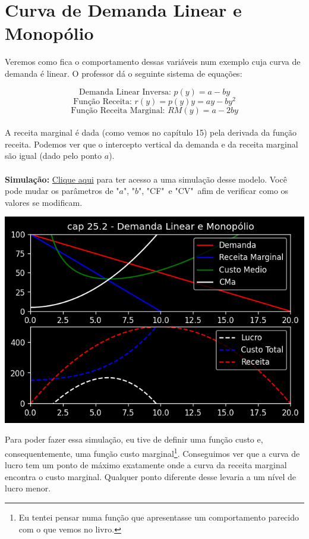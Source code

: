 \documentclass[a4paper,11pt,oneside]{book}
\theoremstyle{definition}
\theoremstyle{break}
\begin{document}
\section{Curva de Demanda Linear e Monopólio}

Veremos como fica o comportamento dessas variáveis num exemplo cuja curva de demanda é linear. O professor dá o seguinte sistema de equações:

$$ \textrm{Demanda Linear Inversa: } p(y) = a - by $$
$$ \textrm{Função Receita: } r(y) = p(y)y = ay - by^2 $$
$$ \textrm{Função Receita Marginal: } RM(y) = a - 2by $$
\\
A receita marginal é dada (como vemos no capítulo 15) pela derivada da função receita. Podemos ver que o intercepto vertical da demanda e da receita marginal são igual (dado pelo ponto $a$).
\\
\\
\textbf{Simulação:} \href{https://colab.research.google.com/drive/1OUK3Z--dv7WMufCLmJ9qDWII1yoVlWVX?usp=sharing}{Clique aqui} para ter acesso a uma simulação desse modelo. Você pode mudar os parâmetros de "$a$", "$b$", "CF"\ e "CV"\ afim de verificar como os valores se modificam.

\begin{center}
\includegraphics[scale=0.8]{cap25_2-demanda_linear_e_monopolio.png}
\end{center}

Para poder fazer essa simulação, eu tive de definir uma função custo e, consequentemente, uma função custo marginal\footnote{Eu tentei pensar numa função que apresentasse um comportamento parecido com o que vemos no livro.}. Conseguimos ver que a curva de lucro tem um ponto de máximo exatamente onde a curva da receita marginal encontra o custo marginal. Qualquer ponto diferente desse levaria a um nível de lucro menor.
\end{document}
